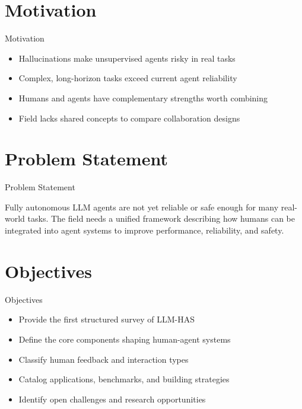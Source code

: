 \documentclass[10pt]{beamer}
\begin{document}
\section{Motivation}
\begin{frame}{Motivation}
\begin{itemize}
  \item Hallucinations make unsupervised agents risky in real tasks
  \item Complex, long-horizon tasks exceed current agent reliability
  \item Humans and agents have complementary strengths worth combining
  \item Field lacks shared concepts to compare collaboration designs
\end{itemize}
\end{frame}

\section{Problem Statement}
\begin{frame}{Problem Statement}
  \begin{block}{}
  Fully autonomous LLM agents are not yet reliable or safe enough for many real-world tasks. The field needs a unified framework describing how humans can be integrated into agent systems to improve performance, reliability, and safety.
  \end{block}
\end{frame}

\section{Objectives}
\begin{frame}{Objectives}
\begin{itemize}
  \item Provide the first structured survey of LLM-HAS
  \item Define the core components shaping human-agent systems
  \item Classify human feedback and interaction types
  \item Catalog applications, benchmarks, and building strategies
  \item Identify open challenges and research opportunities
\end{itemize}
\end{frame}
\end{document}

